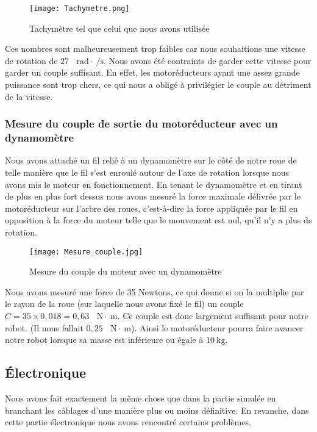 \documentclass[12pt,a4paper]{article}
\begin{document}
	\begin{figure}[ht!]
		\centering
			\texttt{[image: Tachymetre.png]}
			\caption{Tachymètre tel que celui que nous avons utilisée\label{overflow}}
	\end{figure}
Ces nombres sont malheureusement trop faibles car nous souhaitions une vitesse de rotation de $27 \text{ } \SI{}{\radian}\cdot\SI{}{\per\second}$. Nous avons été contraints de garder cette vitesse pour garder un couple suffisant. En effet, les motoréducteurs ayant une assez grande puissance sont trop chers, ce qui nous a obligé à privilégier le couple au détriment de la vitesse.
	
	\subsubsection{Mesure du couple de sortie du motoréducteur avec un dynamomètre}
\indent \indent Nous avons attaché un fil relié à un dynamomètre sur le côté de notre roue de telle manière que le fil s’est enroulé autour de l’axe de rotation lorsque nous avons mis le moteur en fonctionnement. En tenant le dynamomètre et en tirant de plus en plus fort dessus nous avons mesuré la force maximale délivrée par le motoréducteur sur l’arbre des roues, c’est-à-dire la force appliquée par le fil en opposition à la force du moteur telle que le mouvement est nul, qu’il  n’y a plus de rotation.
	\begin{figure}[ht!]
		\centering
			\texttt{[image: Mesure\_couple.jpg]}
			\caption{Mesure du couple du moteur avec un dynamomètre\label{overflow}}
	\end{figure}
	Nous avons mesuré une force de 35 Newtons, ce qui donne si on la multiplie par le rayon de la roue (sur laquelle nous avons fixé le fil) un couple $C = 35 \times 0,018 = 0,63 \text{ } \SI{}{\newton}\cdot\SI{}{\meter}$.
Ce couple est donc largement suffisant pour notre robot. (Il nous fallait $0,25  \text{ } \SI{}{\newton}\cdot\SI{}{\meter}$). 
Ainsi le motoréducteur pourra faire avancer notre robot lorsque sa masse est inférieure ou égale à $\SI{10}{\kilogram}$.
	
	\subsection{Électronique}
	
	Nous avons fait exactement la même chose que dans la partie simulée en branchant les câblages d’une manière plus ou moins définitive. En revanche, dans cette partie électronique nous avons rencontré certains problèmes.
	
\end{document}
